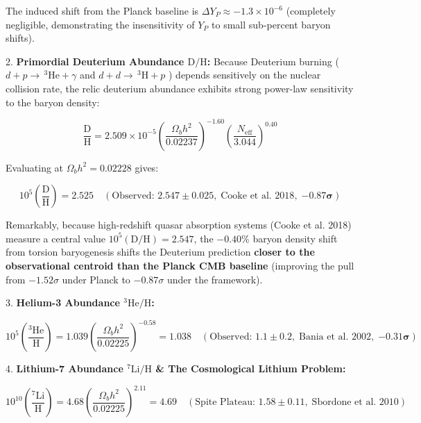 \documentclass[11pt,a4paper]{article}
\theoremstyle{definition}
\theoremstyle{remark}
\begin{document}
The induced shift from the Planck baseline is $\Delta Y_P \approx -1.3 \times 10^{-6}$ (completely negligible, demonstrating the insensitivity of $Y_P$ to small sub-percent baryon shifts).

2. \textbf{Primordial Deuterium Abundance $\text{D/H}$:}
Because Deuterium burning ( $d + p \to \, ^3\text{He} + \gamma$ and $d + d \to \, ^3\text{H} + p$ ) depends sensitively on the nuclear collision rate, the relic deuterium abundance exhibits strong power-law sensitivity to the baryon density:


\begin{equation}
\frac{\text{D}}{\text{H}} = 2.509 \times 10^{-5} \left( \frac{\Omega_b h^2}{0.02237} \right)^{-1.60} \left( \frac{N_{\text{eff}}}{3.044} \right)^{0.40}
\end{equation}


Evaluating at $\Omega_b h^2 = 0.02228$ gives:


\begin{equation}
10^5 \left(\frac{\text{D}}{\text{H}}\right) = 2.525 \quad (\text{Observed: } 2.547 \pm 0.025, \; \text{Cooke et al. 2018}, \; \mathbf{-0.87\sigma})
\end{equation}


Remarkably, because high-redshift quasar absorption systems (Cooke et al. 2018) measure a central value $10^5(\text{D/H}) = 2.547$, the $-0.40\%$ baryon density shift from torsion baryogenesis shifts the Deuterium prediction \textbf{closer to the observational centroid than the Planck CMB baseline} (improving the pull from $-1.52\sigma$ under Planck to $-0.87\sigma$ under the framework).

3. \textbf{Helium-3 Abundance $^3\text{He/H}$:}


\begin{equation}
10^5 \left(\frac{^3\text{He}}{\text{H}}\right) = 1.039 \left( \frac{\Omega_b h^2}{0.02225} \right)^{-0.58} = 1.038 \quad (\text{Observed: } 1.1 \pm 0.2, \; \text{Bania et al. 2002}, \; \mathbf{-0.31\sigma})
\end{equation}


4. \textbf{Lithium-7 Abundance $^7\text{Li/H}$ \& The Cosmological Lithium Problem:}


\begin{equation}
10^{10} \left(\frac{^7\text{Li}}{\text{H}}\right) = 4.68 \left( \frac{\Omega_b h^2}{0.02225} \right)^{2.11} = 4.69 \quad (\text{Spite Plateau: } 1.58 \pm 0.11, \; \text{Sbordone et al. 2010})
\end{equation}
\end{document}
